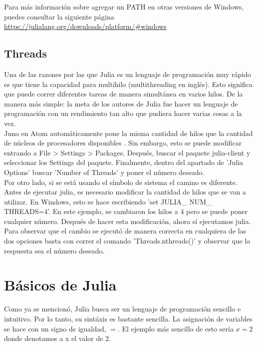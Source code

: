 Para más información sobre agregar un PATH en otras versiones de Windows, puedes consultar la siguiente página \url{https://julialang.org/downloads/platform/#windows}


\subsection{Threads}
Una de las razones por las que Julia es un lenguaje de programación muy rápido es que tiene la capacidad para multihilo (multithreading en inglés). Esto significa que puede correr diferentes tareas de manera simultánea en varios hilos. De la manera más simple: la meta de los autores de Julia fue hacer un lenguaje de programación con un rendimiento tan alto que pudiera hacer varias cosas a la vez. 
\\
Juno en Atom automáticamente pone la misma cantidad de hilos que la cantidad de núcleos de procesadores disponibles \cite{multithreading-julia}. Sin embargo, esto se puede modificar entrando a File > Settings > Packages. Después, buscar el paquete julia-client  y seleccionar los Settings del paquete. Finalmente, dentro del apartado de 'Julia Options' buscar 'Number of Threads' y poner el número deseado. 
\\
Por otro lado, si se está usando el símbolo de sistema el camino es diferente. Antes de ejecutar julia, es necesario modificar la cantidad de hilos que se van a utilizar. En Windows,  esto se hace escribiendo 'set JULIA\_ NUM\_ THREADS=4'.  En este ejemplo, se cambiaron los hilos a 4 pero se puede poner cualquier número.   Después de hacer esta modificación, ahora sí ejecutamos julia. 
\\
Para observar que el cambio se ejecutó de manera correcta en cualquiera de las dos opciones basta con correr el comando 'Threads.nthreads()' y observar que la respuesta sea el número deseado. 


\section{Básicos de Julia}
Como ya se mencionó, Julia busca ser un lenguaje de programación sencillo e intuitivo. Por lo tanto, su sintáxis es bastante sencilla. La asignación de variables se hace con un signo de igualdad, $=$. El ejemplo más sencillo de esto sería $x = 2$ donde denotamos a x el valor de 2. 

